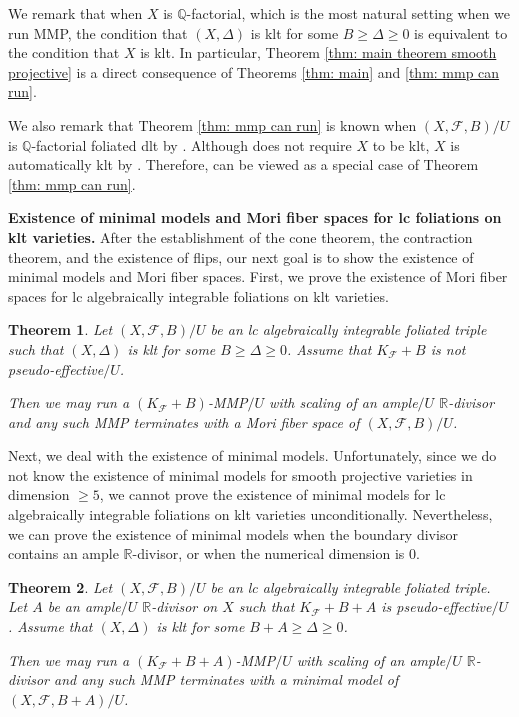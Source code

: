 \documentclass[11pt]{amsart}
\numberwithin{equation}{section}
\newcommand{\Qq}{\mathbb{Q}}
\newcommand{\Rr}{\mathbb{R}}
\newcommand{\Ff}{\mathcal{F}}
\newtheorem{thm}{Theorem}[section]
\theoremstyle{definition}
\theoremstyle{definition}
\theoremstyle{definition}
\begin{document}
We remark that when $X$ is $\Qq$-factorial, which is the most natural setting when we run MMP, the condition that $(X,\Delta)$ is klt for some $B\geq\Delta\geq 0$ is equivalent to the condition that $X$ is klt. In particular, Theorem \ref{thm: main theorem smooth projective} is a direct consequence of Theorems \ref{thm: main} and \ref{thm: mmp can run}.

We also remark that Theorem \ref{thm: mmp can run} is known when $(X,\Ff,B)/U$ is $\Qq$-factorial foliated dlt by \cite[Theorem 2.1.1]{CHLX23}. Although \cite[Theorem 2.1.1]{CHLX23} does not require $X$ to be klt, $X$ is automatically klt by \cite[Theorem 2.1.9]{CHLX23}. Therefore, \cite[Theorem 2.1.1]{CHLX23} can be viewed as a special case of Theorem \ref{thm: mmp can run}.

\medskip

\noindent\textbf{Existence of minimal models and Mori fiber spaces for lc foliations on klt varieties.} After the establishment of the cone theorem, the contraction theorem, and the existence of flips, our next goal is to show the existence of minimal models and Mori fiber spaces. First, we prove the existence of Mori fiber spaces for lc algebraically integrable foliations on klt varieties.

\begin{thm}\label{thm: eomfs}
       Let $(X,\Ff,B)/U$ be an lc algebraically integrable foliated triple such that $(X,\Delta)$ is klt for some $B\geq\Delta\geq 0$. Assume that $K_{\Ff}+B$ is not pseudo-effective$/U$. 
       
       Then we may run a $(K_{\Ff}+B)$-MMP$/U$ with scaling of an ample$/U$ $\Rr$-divisor and any such MMP terminates with a Mori fiber space of $(X,\Ff,B)/U$.
\end{thm}

Next, we deal with the existence of minimal models. Unfortunately, since we do not know the existence of minimal models for smooth projective varieties in dimension $\geq 5$, we cannot prove the existence of minimal models for lc algebraically integrable foliations on klt varieties unconditionally. Nevertheless, we can prove the existence of minimal models when the boundary divisor contains an ample $\Rr$-divisor, or when the numerical dimension is $0$.

\begin{thm}\label{thm: eolmm+A 1} 
Let $(X,\Ff,B)/U$ be an lc algebraically integrable foliated triple. Let $A$ be an ample$/U$ $\Rr$-divisor on $X$ such that $K_{\Ff}+B+A$ is pseudo-effective$/U$. Assume that $(X,\Delta)$ is klt for some $B+A\geq\Delta\geq 0$.  

Then we may run a $(K_{\Ff}+B+A)$-MMP$/U$ with scaling of an ample$/U$ $\Rr$-divisor and any such MMP terminates with a minimal model of $(X,\Ff,B+A)/U$.
\end{thm}
\end{document}
